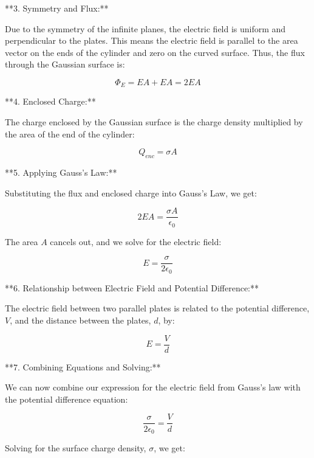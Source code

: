 \documentclass{article}
\begin{document}
**3.  Symmetry and Flux:**

Due to the symmetry of the infinite planes, the electric field is uniform and perpendicular to the plates.  This means the electric field is parallel to the area vector on the ends of the cylinder and zero on the curved surface. Thus, the flux through the Gaussian surface is:

\begin{equation*}
\Phi_E = EA + EA = 2EA
\end{equation*}

**4. Enclosed Charge:**

The charge enclosed by the Gaussian surface is the charge density multiplied by the area of the end of the cylinder:

\begin{equation*}
Q_{enc} = \sigma A
\end{equation*}

**5. Applying Gauss's Law:**

Substituting the flux and enclosed charge into Gauss's Law, we get:

\begin{equation*}
2EA = \frac{\sigma A}{\epsilon_0}
\end{equation*}

The area $A$ cancels out, and we solve for the electric field:

\begin{equation*}
E = \frac{\sigma}{2 \epsilon_0} 
\end{equation*}

**6.  Relationship between Electric Field and Potential Difference:**

The electric field between two parallel plates is related to the potential difference, $V$, and the distance between the plates, $d$, by:

\begin{equation*}
E = \frac{V}{d}
\end{equation*}

**7.  Combining Equations and Solving:**

We can now combine our expression for the electric field from Gauss's law with the potential difference equation:

\begin{equation*}
\frac{\sigma}{2 \epsilon_0}  = \frac{V}{d}
\end{equation*}

Solving for the surface charge density, $\sigma$, we get:
\end{document}
